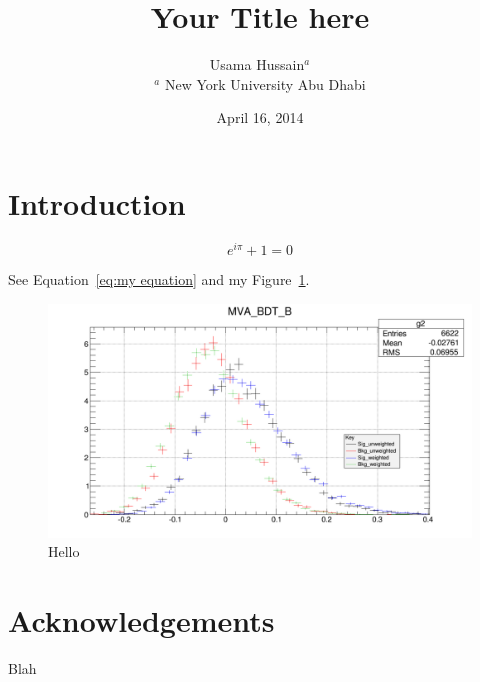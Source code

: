 \documentclass[12pt]{JHEP3}
\author{Usama Hussain$^{a}$\\
$^{a}$ New York University Abu Dhabi
}
\date{April 16, 2014}
\title{Your Title here}
\begin{document}
\section{Introduction}

\begin{equation}
e^{i\pi}+1=0
\label{eq:myequation}
\end{equation}

See Equation~\ref{eq:my equation} and my Figure~\ref{fig:myFig}.

\begin{figure}
\center
\includegraphics[width=.7\textwidth]{BDT_test_WvUn.pdf}
\caption{Hello}
\label{fig:myFig}
\end{figure}



\section*{Acknowledgements}

Blah
%
%
\end{document}
